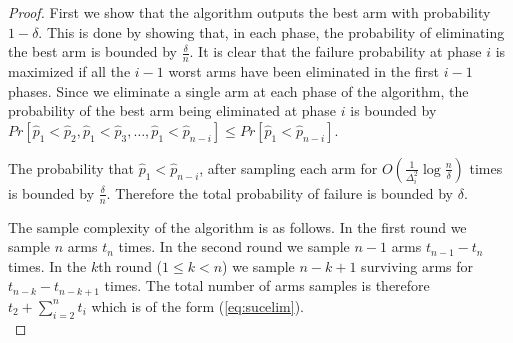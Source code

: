 \begin{proof}




First we show that the algorithm outputs the best arm with probability $1 - \delta$.
This is done by showing that, in each phase, the probability of eliminating the
best arm is bounded by $\frac{\delta}{n}$. It is clear that the failure probability at phase $i$ is
maximized if all the $i-1$ worst arms have been eliminated in the first $i-1$ phases. Since we eliminate a single arm at each phase of the algorithm, the probability of the best arm being eliminated at phase $i$ is bounded by
$Pr[\hat{p}_1 < \hat{p}_2, \hat{p}_1 < \hat{p}_3, \ldots, \hat{p}_1 < \hat{p}_{n-i}] \leq Pr[\hat{p}_1 < \hat{p}_{n-i}]$.

The probability that $\hat{p}_1 < \hat{p}_{n-i}$, after sampling each arm for $O(\frac{1}{\Delta^2_i}\log\frac{n}{\delta})$ times is bounded by $\frac{\delta}{n}$. Therefore the total probability of failure is bounded by $\delta$.


The sample complexity of the algorithm is as follows.
In the first round we sample $n$ arms $t_n$ times. In the second
round we sample $n-1$ arms $t_{n-1 } - t_n$ times. In the $k$th round ($1\leq k<n$)
we sample $n-k+1$ surviving arms for $t_{n-k} - t_{n-k+1}$ times. The total number of arms samples is therefore
$t_2 + \sum_{i=2}^n t_i$ which is of the form (\ref{eq:sucelim}).\\

\begin{comment}
We now prove that the algorithm is correct with probability at least $1-\delta$.
Consider first a simplified algorithm which is similar to the naive algorithm, suppose that
each arm is pulled $8/(\Delta_{2}^2) \ln(2n/\delta)$ times.
For every $2\le i \le n-1$ we define the event
$$
E_i = \left\{\hat{p_1}^{t_j} \geq \hat{p_i}^{t_j}
|\forall t_j \,{\rm s.t.}\, j \geq i\right\},$$
where  $\hat{p_i}^{t_j}$ is the
empirical value the $i$th arm at time $t_j$. If the events
$E_i$ hold for all $i>1$ the algorithm is successful.
\begin{eqnarray*}
\P[\mbox{not}( E_i)] &\leq& \sum_{j=i}^n \P[\hat{p_n}^{t_j} <
\hat{p_i}^{t_j}]\\
& \leq & \sum_{j=i}^n 2\exp(-2(\Delta_i/2)^2 t_j) \leq \sum_{j=i}^n
2\exp(-2(\Delta_i/2)^2 8/ \Delta_j^2 \ln(2n/ \delta))\\
& \leq & \sum_{j=i}^n 2 \exp (-\ln (4n^2 / \delta^2)) \\
& \leq & (n-i+1) \delta^2/n^2 \leq \frac{\delta}{n}.
\end{eqnarray*}
Using the union bound over all $E_i$'s we obtain that the simplified
algorithm satisfies all $E_i$ with probability at least $1- \delta$.
Consider the original setup. If arm $1$ is eliminated at time $t_j$
for some is implies that some arm $i<j$ has higher empirical value
at time $t_j$. The probability of failure of the here is bounded by
the probability of failure in the simplified setting.
\end{comment}
\end{proof}



